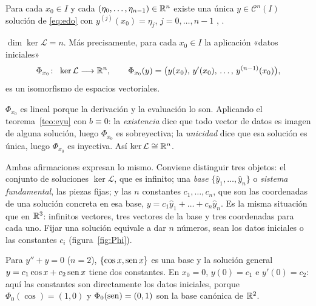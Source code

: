 \documentclass[11pt,twoside]{article}
\newcommand\Lop{\mathcal L}
\newcommand\yh{\hat y}
\newcommand\Cl{\mathcal C}
\begin{document}
\begin{teorema}\label{teo:eyu}
Para cada $x_0\in I$ y cada $(\eta_0,\dots,\eta_{n-1})\in\mathbb{R}^n$ existe una única $y\in\Cl^n(I)$ solución de
\eqref{eq:edo} con $y^{(j)}(x_0)=\eta_j$, $j=0,\dots,n-1$ \cite[cap.~3]{coddington}, \cite[cap.~IV]{usal}.
\end{teorema}

\begin{teorema}\label{teo:dim}
$\dim\ker\Lop=n$. Más precisamente, para cada $x_0\in I$ la aplicación «datos iniciales»
\begin{equation}\label{eq:Phi}
\Phi_{x_0}\colon\ \ker\Lop\longrightarrow\R^n,\qquad
\Phi_{x_0}(y)=\big(y(x_0),\,y'(x_0),\,\dots,\,y^{(n-1)}(x_0)\big),
\end{equation}
es un isomorfismo de espacios vectoriales.
\end{teorema}

\begin{demostracion}
$\Phi_{x_0}$ es lineal porque la derivación y la evaluación lo son. Aplicando el teorema~\ref{teo:eyu} con $b\equiv0$:
la \emph{existencia} dice que todo vector de datos es imagen de alguna solución, luego $\Phi_{x_0}$ es sobreyectiva; la
\emph{unicidad} dice que esa solución es única, luego $\Phi_{x_0}$ es inyectiva. Así $\ker\Lop\cong\R^n$.
\end{demostracion}

\begin{observacion}\label{obs:nconst}
Ambas afirmaciones expresan lo mismo. Conviene distinguir tres objetos: el conjunto de soluciones $\ker\Lop$, que es
infinito; una \emph{base} $\{\yh_1,\dots,\yh_n\}$ o \emph{sistema fundamental}, las piezas fijas; y las $n$ constantes
$c_1,\dots,c_n$, que son las coordenadas de una solución concreta en esa base, $y=c_1\yh_1+\dots+c_n\yh_n$. Es la misma
situación que en $\mathbb{R}^3$: infinitos vectores, tres vectores de la base y tres coordenadas para cada uno. Fijar una
solución equivale a dar $n$ números, sean los datos iniciales o las constantes $c_i$ (figura~\ref{fig:Phi}).
\end{observacion}

\begin{ejemplo}\label{ej:cosen}
Para $y''+y=0$ ($n=2$), $\{\cos x,\operatorname{sen} x\}$ es una base y la solución general $y=c_1\cos x+c_2\operatorname{sen} x$ tiene dos
constantes. En $x_0=0$, $y(0)=c_1$ e $y'(0)=c_2$: aquí las constantes son directamente los datos iniciales, porque
$\Phi_0(\cos)=(1,0)$ y $\Phi_0(\operatorname{sen})=(0,1)$ son la base canónica de $\mathbb{R}^2$.
\end{ejemplo}
\end{document}

